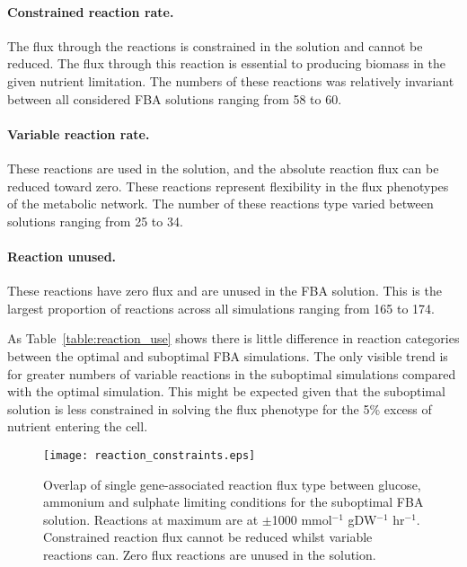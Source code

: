 \paragraph{Constrained reaction rate.} The flux through the reactions is constrained in the solution and cannot be reduced. The flux through this reaction is essential to producing biomass in the given nutrient limitation. The numbers of these reactions was relatively invariant between all considered FBA solutions ranging from 58 to 60.

\paragraph{Variable reaction rate.} These reactions are used in the solution, and the absolute reaction flux can be reduced toward zero. These reactions represent flexibility in the flux phenotypes of the metabolic network. The number of these reactions type varied between solutions ranging from 25 to 34.

\paragraph{Reaction unused.} These reactions have zero flux and are unused in the FBA solution. This is the largest proportion of reactions across all simulations ranging from 165 to 174.

\par

As Table~\vref{table:reaction_use} shows there is little difference in reaction categories between the optimal and suboptimal FBA simulations. The only visible trend is for greater numbers of variable reactions in the suboptimal simulations compared with the optimal simulation. This might be expected given that the suboptimal solution is less constrained in solving the flux phenotype for the 5\% excess of nutrient entering the cell.

\begin{figure}%
  \centering
  \texttt{[image: reaction\_constraints.eps]}
  \caption[Overlap of reaction type between glucose, ammonium and sulphate limiting conditions]{Overlap of single gene-associated reaction flux type between glucose, ammonium and sulphate limiting conditions for the suboptimal FBA solution. Reactions at maximum are at $\pm$1000 mmol$^{-1}$ gDW$^{-1}$ hr$^{-1}$. Constrained reaction flux cannot be reduced whilst variable reactions can. Zero flux reactions are unused in the solution. }
  \label{figure:reaction_constraints}
\end{figure}%

